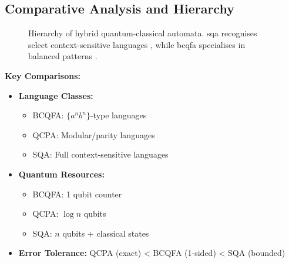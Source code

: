 \subsection*{Comparative Analysis and Hierarchy}
\begin{figure}[h]
\centering
{}
\caption{Hierarchy of hybrid quantum-classical automata. \gls{sqa} recognises select context-sensitive languages \cite{zheng2012two}, while \gls{bcqfa} specialises in balanced patterns \cite{ambainis1998}.}
\label{fig:hybrid-hierarchy}
\end{figure}

\textbf{Key Comparisons:}
\begin{itemize}
    \item \textbf{Language Classes:}
    \begin{itemize}
        \item BCQFA: $\{a^nb^n\}$-type languages
        \item QCPA: Modular/parity languages
        \item SQA: Full context-sensitive languages
    \end{itemize}
    \item \textbf{Quantum Resources:}
    \begin{itemize}
        \item BCQFA: 1 qubit counter
        \item QCPA: $\log n$ qubits
        \item SQA: $n$ qubits + classical states
    \end{itemize}
    \item \textbf{Error Tolerance:} QCPA (exact) < BCQFA (1-sided) < SQA (bounded)
\end{itemize}
